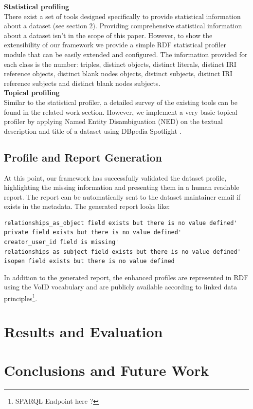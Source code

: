 \documentclass[runningheads,a4paper]{llncs}
\begin{document}
\textbf{Statistical profiling}\\

There exist a set of tools designed specifically to provide statistical information about a dataset (see section 2). Providing comprehensive statistical information about a dataset isn't in the scope of this paper. However, to show the extensibility of our framework we provide a simple RDF statistical profiler module that can be easily extended and configured. The information provided for each class is the number: triples, distinct objects, distinct literals, distinct IRI reference objects, distinct blank nodes objects, distinct subjects,
distinct IRI reference subjects and distinct blank nodes subjects.\\

\textbf{Topical profiling}\\

Similar to the statistical profiler, a detailed survey of the existing tools can be found in the related work section. However, we implement a very basic topical profiler by applying Named Entity Disambiguation (NED) on the textual description and title of a dataset using DBpedia Spotlight \cite{Mendes:2011:DSS:2063518.2063519}.

\subsection{Profile and Report Generation}

At this point, our framework has successfully validated the dataset profile, highlighting the missing information and presenting them in a human readable report. The report can be automatically sent to the dataset maintainer email if exists in the metadata. The generated report looks like:

\begin{lstlisting}
relationships_as_object field exists but there is no value defined'
private field exists but there is no value defined'
creator_user_id field is missing'
relationships_as_subject field exists but there is no value defined'
isopen field exists but there is no value defined
\end{lstlisting}

In addition to the generated report, the enhanced profiles are represented in RDF using the VoID vocabulary and are publicly available according to linked data principles\footnote{SPARQL Endpoint here ?}.


\section{Results and Evaluation}
\label{sec:Results and Evaluation}

\section{Conclusions and Future Work}
\label{sec:Conclusion and Future Work}


\nocite{*}

\end{document}
